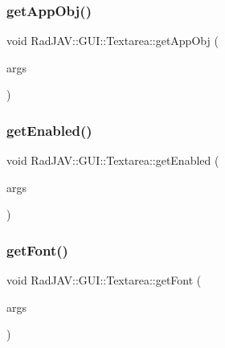 \subsubsection{\texorpdfstring{get\+App\+Obj()}{getAppObj()}}
{\footnotesize\ttfamily void Rad\+J\+A\+V\+::\+G\+U\+I\+::\+Textarea\+::get\+App\+Obj (\begin{DoxyParamCaption}\item[{const v8\+::\+Function\+Callback\+Info$<$ v8\+::\+Value $>$ \&}]{args }\end{DoxyParamCaption})\hspace{0.3cm}{\ttfamily [static]}}

\mbox{\label{class_rad_j_a_v_1_1_g_u_i_1_1_textarea_a6995e6206b190c4b56121074a2b6eb24}} 
\subsubsection{\texorpdfstring{get\+Enabled()}{getEnabled()}}
{\footnotesize\ttfamily void Rad\+J\+A\+V\+::\+G\+U\+I\+::\+Textarea\+::get\+Enabled (\begin{DoxyParamCaption}\item[{const v8\+::\+Function\+Callback\+Info$<$ v8\+::\+Value $>$ \&}]{args }\end{DoxyParamCaption})\hspace{0.3cm}{\ttfamily [static]}}

\mbox{\label{class_rad_j_a_v_1_1_g_u_i_1_1_textarea_abdc535be261de79b863c3b98504d698d}} 
\subsubsection{\texorpdfstring{get\+Font()}{getFont()}}
{\footnotesize\ttfamily void Rad\+J\+A\+V\+::\+G\+U\+I\+::\+Textarea\+::get\+Font (\begin{DoxyParamCaption}\item[{const v8\+::\+Function\+Callback\+Info$<$ v8\+::\+Value $>$ \&}]{args }\end{DoxyParamCaption})\hspace{0.3cm}{\ttfamily [static]}}

